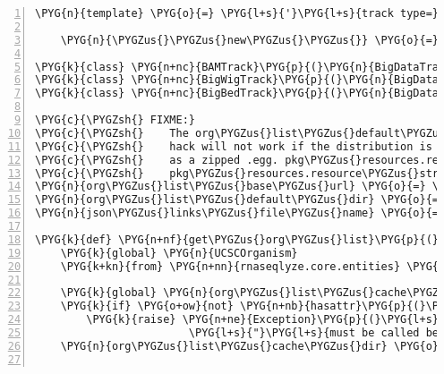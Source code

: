 \begin{Verbatim}[commandchars=\\\{\},numbers=left,firstnumber=1,stepnumber=5]
    \PYG{n}{template} \PYG{o}{=} \PYG{l+s}{'}\PYG{l+s}{track type=}\PYG{l+s}{"}\PYG{l+s}{\PYGZob{}type\PYGZcb{}}\PYG{l+s}{"}\PYG{l+s}{ name=}\PYG{l+s}{"}\PYG{l+s}{\PYGZob{}name\PYGZcb{}}\PYG{l+s}{"}\PYG{l+s}{ bigDataUrl=}\PYG{l+s}{"}\PYG{l+s}{\PYGZob{}url\PYGZcb{}}\PYG{l+s}{"}\PYG{l+s}{'}

    \PYG{n}{\PYGZus{}\PYGZus{}new\PYGZus{}\PYGZus{}} \PYG{o}{=} \PYG{k}{lambda} \PYG{n}{cls}\PYG{p}{,} \PYG{o}{*}\PYG{o}{*}\PYG{n}{kwargs}\PYG{p}{:} \PYG{n}{cls}\PYG{o}{.}\PYG{n}{template}\PYG{o}{.}\PYG{n}{format}\PYG{p}{(}\PYG{n+nb}{type}\PYG{o}{=}\PYG{n}{cls}\PYG{o}{.}\PYG{n}{type}\PYG{p}{,} \PYG{o}{*}\PYG{o}{*}\PYG{n}{kwargs}\PYG{p}{)}

\PYG{k}{class} \PYG{n+nc}{BAMTrack}\PYG{p}{(}\PYG{n}{BigDataTrack}\PYG{p}{)}\PYG{p}{:} \PYG{n+nb}{type} \PYG{o}{=} \PYG{l+s}{"}\PYG{l+s}{bam}\PYG{l+s}{"}
\PYG{k}{class} \PYG{n+nc}{BigWigTrack}\PYG{p}{(}\PYG{n}{BigDataTrack}\PYG{p}{)}\PYG{p}{:} \PYG{n+nb}{type} \PYG{o}{=} \PYG{l+s}{"}\PYG{l+s}{bigWig}\PYG{l+s}{"}
\PYG{k}{class} \PYG{n+nc}{BigBedTrack}\PYG{p}{(}\PYG{n}{BigDataTrack}\PYG{p}{)}\PYG{p}{:} \PYG{n+nb}{type} \PYG{o}{=} \PYG{l+s}{"}\PYG{l+s}{bigBed}\PYG{l+s}{"}

\PYG{c}{\PYGZsh{} FIXME:}
\PYG{c}{\PYGZsh{}    The org\PYGZus{}list\PYGZus{}default\PYGZus{}dir = dirname(\PYGZus{}\PYGZus{}file\PYGZus{}\PYGZus{})}
\PYG{c}{\PYGZsh{}    hack will not work if the distribution is installed}
\PYG{c}{\PYGZsh{}    as a zipped .egg. pkg\PYGZus{}resources.resource\PYGZus{}stream or}
\PYG{c}{\PYGZsh{}    pkg\PYGZus{}resources.resource\PYGZus{}string should be used instead.}
\PYG{n}{org\PYGZus{}list\PYGZus{}base\PYGZus{}url} \PYG{o}{=} \PYG{l+s}{"}\PYG{l+s}{http://archaea.ucsc.edu/wp-content/data/}\PYG{l+s}{"}
\PYG{n}{org\PYGZus{}list\PYGZus{}default\PYGZus{}dir} \PYG{o}{=} \PYG{n}{join}\PYG{p}{(}\PYG{n}{dirname}\PYG{p}{(}\PYG{n}{\PYGZus{}\PYGZus{}file\PYGZus{}\PYGZus{}}\PYG{p}{)}\PYG{p}{,} \PYG{l+s}{"}\PYG{l+s}{ucscbrowser-data}\PYG{l+s}{"}\PYG{p}{)}
\PYG{n}{json\PYGZus{}links\PYGZus{}file\PYGZus{}name} \PYG{o}{=} \PYG{l+s}{"}\PYG{l+s}{ucsc-wp-data.html}\PYG{l+s}{"}

\PYG{k}{def} \PYG{n+nf}{get\PYGZus{}org\PYGZus{}list}\PYG{p}{(}\PYG{p}{)}\PYG{p}{:}
    \PYG{k}{global} \PYG{n}{UCSCOrganism}
    \PYG{k+kn}{from} \PYG{n+nn}{rnaseqlyze.core.entities} \PYG{k+kn}{import} \PYG{n}{UCSCOrganism}

    \PYG{k}{global} \PYG{n}{org\PYGZus{}list\PYGZus{}cache\PYGZus{}dir}
    \PYG{k}{if} \PYG{o+ow}{not} \PYG{n+nb}{hasattr}\PYG{p}{(}\PYG{n}{rnaseqlyze}\PYG{p}{,} \PYG{l+s}{'}\PYG{l+s}{ucsc\PYGZus{}org\PYGZus{}list\PYGZus{}cache\PYGZus{}dir}\PYG{l+s}{'}\PYG{p}{)}\PYG{p}{:}
        \PYG{k}{raise} \PYG{n+ne}{Exception}\PYG{p}{(}\PYG{l+s}{"}\PYG{l+s}{rnaseqlyze.configure(workdir) }\PYG{l+s}{"}
                        \PYG{l+s}{"}\PYG{l+s}{must be called before calling this function}\PYG{l+s}{"}\PYG{p}{)}
    \PYG{n}{org\PYGZus{}list\PYGZus{}cache\PYGZus{}dir} \PYG{o}{=} \PYG{n}{rnaseqlyze}\PYG{o}{.}\PYG{n}{ucsc\PYGZus{}org\PYGZus{}list\PYGZus{}cache\PYGZus{}dir}


\end{Verbatim}
